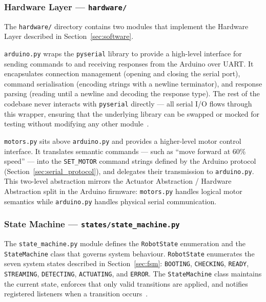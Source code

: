 \subsubsection{Hardware Layer — \texttt{hardware/}}
 
The \texttt{hardware/} directory contains two modules that implement
the Hardware Layer described in Section~\ref{sec:software}.
 
\texttt{arduino.py} wraps the \texttt{pyserial} library \cite{pyserial}
to provide a high-level interface for sending commands to and
receiving responses from the Arduino over UART. It encapsulates
connection management (opening and closing the serial port), command
serialisation (encoding strings with a newline terminator), and
response parsing (reading until a newline and decoding the response
type). The rest of the codebase never interacts with \texttt{pyserial}
directly — all serial I/O flows through this wrapper, ensuring that
the underlying library can be swapped or mocked for testing without
modifying any other module~\cite{gamma1994design}.
 
\texttt{motors.py} sits above \texttt{arduino.py} and provides
a higher-level motor control interface. It translates semantic
commands — such as ``move forward at 60\% speed'' — into the
\texttt{SET\_MOTOR} command strings defined by the Arduino protocol
(Section~\ref{sec:serial_protocol}), and delegates their transmission
to \texttt{arduino.py}. This two-level abstraction mirrors the
Actuator Abstraction / Hardware Abstraction split in the Arduino
firmware: \texttt{motors.py} handles logical motor semantics while
\texttt{arduino.py} handles physical serial communication.
 
\subsubsection{State Machine — \texttt{states/state\_machine.py}}
 
The \texttt{state\_machine.py} module defines the \texttt{RobotState}
enumeration and the \texttt{StateMachine} class that governs system
behaviour. \texttt{RobotState} enumerates the seven system states
described in Section~\ref{sec:fsm}: \texttt{BOOTING},
\texttt{CHECKING}, \texttt{READY}, \texttt{STREAMING},
\texttt{DETECTING}, \texttt{ACTUATING}, and \texttt{ERROR}.
The \texttt{StateMachine} class maintains the current state, enforces
that only valid transitions are applied, and notifies registered
listeners when a transition occurs~\cite{hopcroft2006automata}.
 
